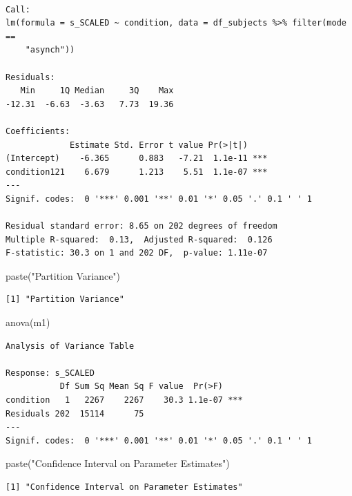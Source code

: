 \documentclass[
  letterpaper,
  DIV=11,
  numbers=noendperiod]{scrreprt}
\newenvironment{Shaded}{\begin{snugshade}}{\end{snugshade}}
\newcommand{\FunctionTok}[1]{\textcolor[rgb]{0.28,0.35,0.67}{#1}}
\newcommand{\NormalTok}[1]{\textcolor[rgb]{0.00,0.23,0.31}{#1}}
\newcommand{\StringTok}[1]{\textcolor[rgb]{0.13,0.47,0.30}{#1}}
\begin{document}
\begin{verbatim}

Call:
lm(formula = s_SCALED ~ condition, data = df_subjects %>% filter(mode == 
    "asynch"))

Residuals:
   Min     1Q Median     3Q    Max 
-12.31  -6.63  -3.63   7.73  19.36 

Coefficients:
             Estimate Std. Error t value Pr(>|t|)    
(Intercept)    -6.365      0.883   -7.21  1.1e-11 ***
condition121    6.679      1.213    5.51  1.1e-07 ***
---
Signif. codes:  0 '***' 0.001 '**' 0.01 '*' 0.05 '.' 0.1 ' ' 1

Residual standard error: 8.65 on 202 degrees of freedom
Multiple R-squared:  0.13,  Adjusted R-squared:  0.126 
F-statistic: 30.3 on 1 and 202 DF,  p-value: 1.11e-07
\end{verbatim}

\begin{Shaded}
\begin{Highlighting}[]
\FunctionTok{paste}\NormalTok{(}\StringTok{"Partition Variance"}\NormalTok{)}
\end{Highlighting}
\end{Shaded}

\begin{verbatim}
[1] "Partition Variance"
\end{verbatim}

\begin{Shaded}
\begin{Highlighting}[]
\FunctionTok{anova}\NormalTok{(m1)}
\end{Highlighting}
\end{Shaded}

\begin{verbatim}
Analysis of Variance Table

Response: s_SCALED
           Df Sum Sq Mean Sq F value  Pr(>F)    
condition   1   2267    2267    30.3 1.1e-07 ***
Residuals 202  15114      75                    
---
Signif. codes:  0 '***' 0.001 '**' 0.01 '*' 0.05 '.' 0.1 ' ' 1
\end{verbatim}

\begin{Shaded}
\begin{Highlighting}[]
\FunctionTok{paste}\NormalTok{(}\StringTok{"Confidence Interval on Parameter Estimates"}\NormalTok{)}
\end{Highlighting}
\end{Shaded}

\begin{verbatim}
[1] "Confidence Interval on Parameter Estimates"
\end{verbatim}
\end{document}
